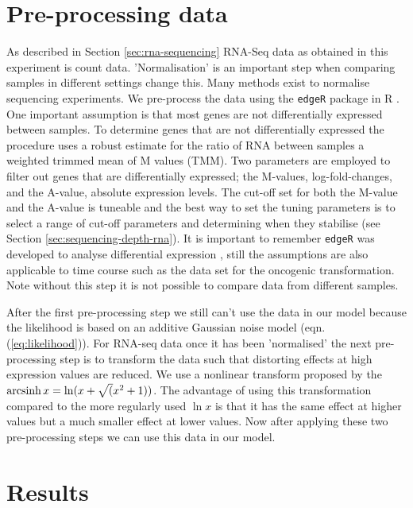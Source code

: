 \section{Pre-processing data}
\label{sec:norm-stand}

As described in Section \ref{sec:rna-sequencing} RNA-Seq data as obtained in this experiment is count data. 'Normalisation' is an important step when comparing samples in different settings {\color{red} change this}. Many methods exist to normalise sequencing experiments. We pre-process the data using the \texttt{edgeR} package in R \cite{McCarthy:2012wg,Robinson:2010cw}. One important assumption is that most genes are not differentially expressed between samples. To determine genes that are not differentially expressed the procedure uses a robust estimate for the ratio of RNA between samples a weighted trimmed mean of M values (TMM). Two parameters are employed to filter out genes that are differentially expressed; the M-values, log-fold-changes, and the A-value, absolute expression levels. The cut-off set for both the M-value and the A-value is tuneable and the best way to set the tuning parameters is to select a range of cut-off parameters and determining when they stabilise (see Section \ref{sec:sequencing-depth-rna}). It is important to remember \texttt{edgeR} was developed to analyse differential expression \cite{Robinson:2010dd}, still the assumptions are also applicable to time course such as the data set for the oncogenic transformation. Note without this step it is not possible to compare data from different samples.

After the first pre-processing step we still can't use the data in our model because the likelihood is based on an additive Gaussian noise model (eqn. (\ref{eq:likelihood})). For RNA-seq data once it has been 'normalised' the next pre-processing step is to transform the data such that distorting effects at high expression values are reduced. We use a nonlinear transform proposed by \cite{Hoffman:2012gn} the $\operatorname{arcsinh} x = \ln(x + \sqrt (x^2 + 1))$. The advantage of using this transformation compared to the more regularly used $\ln x$ is that it has the same effect at higher values but a much smaller effect at lower values. Now after applying these two pre-processing steps we can use this data in our model.

\section{Results}
\label{sec:results-mcf10a}

